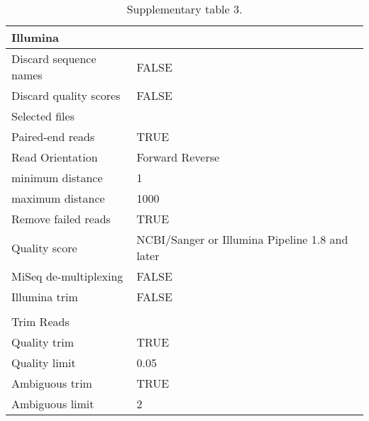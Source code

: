 
\begin{longtable}{ll}
\caption{Supplementary table 3.}
\label{tab:ch2_suptable3}\\
\multicolumn{2}{l}{Illumina}                                                                  \\
\endfirsthead
%
\endhead
%
\small
Discard sequence names                       & FALSE                                          \\
Discard quality scores                       & FALSE                                          \\
Selected files                               &                                                \\
Paired-end reads                             & TRUE                                           \\
Read Orientation                             & Forward Reverse                                \\
minimum distance                             & 1                                              \\
maximum distance                             & 1000                                           \\
Remove failed reads                          & TRUE                                           \\
Quality score                                & NCBI/Sanger or Illumina Pipeline 1.8 and later \\
MiSeq de-multiplexing                        & FALSE                                          \\
Illumina trim                                & FALSE                                          \\
                                             &                                                \\
Trim Reads                                   &                                                \\
Quality trim                                 & TRUE                                           \\
Quality limit                                & 0.05                                           \\
Ambiguous trim                               & TRUE                                           \\
Ambiguous limit                              & 2                                              \\

\end{longtable}
